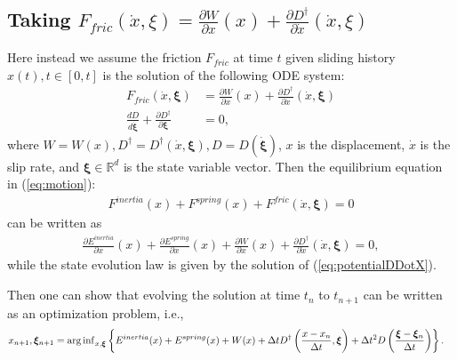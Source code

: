 \subsection{Taking $F_{fric}(\dot{x}, \xi)=\frac{\partial W}{\partial x}(x) + \frac{\partial D^\dagger}{\partial \dot{x}}(\dot{x}, \xi)$}
Here instead we assume the friction $F_{fric}$ at time $t$ given sliding history $x(t), t \in [0, t]$ is the solution of the following ODE system:
\begin{align}
    F_{fric}(\dot{x}, \boldsymbol{\xi}) &= \frac{\partial W}{\partial x}(x) + \frac{\partial D^\dagger}{\partial \dot{x}}(\dot{x}, \bm{\xi}) \label{eq:potentialWDDotX}\\
    \frac{d D}{d \dot{\boldsymbol{\xi}}} + \frac{\partial D^\dagger}{\partial \boldsymbol{\xi}} &= 0 \label{eq:potentialDDotX}, 
\end{align}
where $W = W(x), D^\dagger = D^\dagger(\dot{x}, \boldsymbol{\xi}), D = D(\dot{\boldsymbol{\xi}})$, 
$x$ is the displacement, $\dot{x}$ is the slip rate, and 
$\bm{\xi} \in \mathbb{R}^d$ is the state variable vector. 
Then the equilibrium equation in (\ref{eq:motion}):
\begin{align*}
    F^{inertia}(x) + F^{spring}(x) + F^{fric}(\dot{x}, \bm{\xi}) = 0
\end{align*}
can be written as 
\begin{align}
    \frac{\partial E^{inertia}}{\partial x}(x) + \frac{\partial E^{spring}}{\partial x}(x) 
    + \frac{\partial W}{\partial x} (x) 
    + \frac{\partial D^\dagger}{\partial \dot{x}}(\dot{x}, \bm{\xi}) = 0 \label{eq:WDPotentialMotionDotX}, 
\end{align}
while the state evolution law is given by the solution of (\ref{eq:potentialDDotX}). 

Then one can show that evolving the solution at time $t_n$ to $t_{n+1}$ can be written as an optimization problem, i.e., 
\begin{align}
    x_{n+1}, \bm{\xi}_{n+1} &= \operatorname{arg\,inf}_{x, \bm{\xi}} \left\{E^{inertia}(x) + E^{spring}(x) + W(x) + \Delta t D^\dagger\left(\frac{x - x_n}{\Delta t}, \bm{\xi}\right) + \Delta t^2 D\left(\frac{\bm{\xi}-\bm{\xi}_n}{\Delta t}\right)\right\}. \label{eq:nToNPlusOneDotX}
\end{align}

